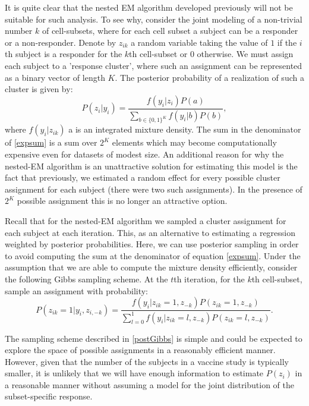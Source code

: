 \documentclass{article}\usepackage[]{graphicx}\usepackage[]{color}
\begin{document}
It is quite clear that the nested EM algorithm developed previously will not be suitable for such analysis. To see why, consider the joint modeling of a non-trivial number $k$ of cell-subsets, where for each cell subset a subject can be a responder or a non-responder. Denote by $z_{ik}$ a random variable taking the value of $1$ if the $i$th subject is a responder for the $k$th cell-subset or $0$ otherwise. We must assign each subject to a 'response cluster', where such an assignment can be represented as a binary vector of length $K$. The posterior probability of a realization of such a cluster is given by:
\begin{equation}\label{expsum}
P(z_{i} | y_{i}) = \frac{ f(y_i | z_{i}) P(a) }{ \sum_{ b \in \{0,1\}^{K}} f(y_i | b) P(b)},
\end{equation}
where $f(y_i | z_{ik})$ a is an integrated mixture density. The sum in the denominator of \eqref{expsum} is a sum over $2^{K}$ elements which may become computationally expensive even for datasets of modest size. An additional reason for why the nested-EM algorithm is an unattractive solution for estimating this model is the fact that previously, we estimated a random effect for every possible cluster assignment for each subject (there were two such assignments). In the presence of $2^K$ possible assignment this is no longer an attractive option. 

Recall that for the nested-EM algorithm we sampled a cluster assignment for each subject at each iteration. This, as an alternative to estimating a regression weighted by posterior probabilities. Here, we can use posterior sampling in order to avoid computing the sum at the denominator of equation \eqref{expsum}. Under the assumption that we are able to compute the mixture density efficiently, consider the following Gibbs sampling scheme.  At the $t$th iteration, for the $k$th cell-subset, sample an assignment with probability:
\begin{equation}\label{postGibbs}
P(z_{ik} = 1 | y_i, z_{i,-k}) = 
\frac{f(y_i | z_{ik} = 1, z_{-k}) P( z_{ik} = 1, z_{-k})}
{\sum_{l=0}^{1} f(y_i | z_{ik} = l, z_{-k}) P( z_{ik} = l, z_{-k})}.
\end{equation}

The sampling scheme described in \eqref{postGibbs} is simple and could be expected to explore the space of possible assignments in a reasonably efficient manner. However, given that the number of the subjects in a vaccine study is typically smaller, it is unlikely that we will have enough information to estimate $P(z_{i})$ in a reasonable manner without assuming a model for the joint distribution of the subset-specific response. 
\end{document}
